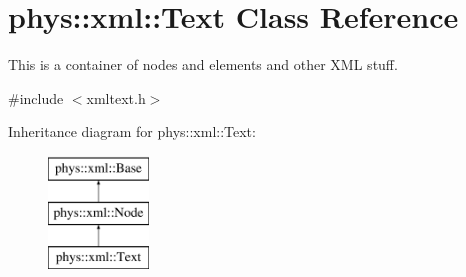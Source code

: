 \hypertarget{classphys_1_1xml_1_1Text}{
\section{phys::xml::Text Class Reference}
\label{d3/da7/classphys_1_1xml_1_1Text}
}


This is a container of nodes and elements and other XML stuff.  




{\ttfamily \#include $<$xmltext.h$>$}

Inheritance diagram for phys::xml::Text:\begin{figure}[H]
\begin{center}
\leavevmode
\includegraphics[height=3.000000cm]{d3/da7/classphys_1_1xml_1_1Text}
\end{center}
\end{figure}
